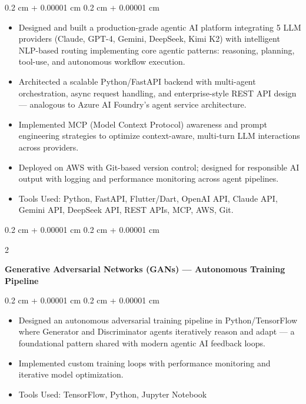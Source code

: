 \documentclass[10pt, letterpaper]{article}
\newenvironment{highlights}{
    \begin{itemize}[
        topsep=0.10 cm,
        parsep=0.10 cm,
        partopsep=0pt,
        itemsep=0pt,
        leftmargin=0.4 cm + 10pt
    ]
}{
    \end{itemize}
}
\newenvironment{onecolentry}{
    \begin{adjustwidth}{
        0.2 cm + 0.00001 cm
    }{
        0.2 cm + 0.00001 cm
    }
}{
    \end{adjustwidth}
}
\newenvironment{twocolentry}[2][]{
    \onecolentry
    \def\secondColumn{#2}
    \setcolumnwidth{\fill, 4.5 cm}
    \begin{paracol}{2}
}{
    \switchcolumn \raggedleft \secondColumn
    \end{paracol}
    \endonecolentry
}
\let\hrefWithoutArrow\href
\renewcommand{\href}[2]{\hrefWithoutArrow{#1}{\ifthenelse{\equal{#2}{}}{ }{#2 }\raisebox{.15ex}{\footnotesize \faExternalLink*}}}
\begin{document}
        \vspace{0.10 cm}
        \begin{onecolentry}
            \begin{highlights}
                \item Designed and built a production-grade agentic AI platform integrating 5 LLM providers (Claude, GPT-4, Gemini, DeepSeek, Kimi K2) with intelligent NLP-based routing implementing core agentic patterns: reasoning, planning, tool-use, and autonomous workflow execution.
                \item Architected a scalable Python/FastAPI backend with multi-agent orchestration, async request handling, and enterprise-style REST API design — analogous to Azure AI Foundry's agent service architecture.
                \item Implemented MCP (Model Context Protocol) awareness and prompt engineering strategies to optimize context-aware, multi-turn LLM interactions across providers.
                \item Deployed on AWS with Git-based version control; designed for responsible AI output with logging and performance monitoring across agent pipelines.
                \item Tools Used: Python, FastAPI, Flutter/Dart, OpenAI API, Claude API, Gemini API, DeepSeek API, REST APIs, MCP, AWS, Git.
            \end{highlights}
        \end{onecolentry}

        \vspace{0.2 cm}

        \begin{twocolentry}{
            \textit{\href{https://GitHub.com/yashpalsince2004/Generative-Adversarial-Networks-GANs-with-TensorFlow.git}{GAN}}}
            \textbf{Generative Adversarial Networks (GANs) — Autonomous Training Pipeline}
        \end{twocolentry}

        \vspace{0.10 cm}
        \begin{onecolentry}
            \begin{highlights}
                \item Designed an autonomous adversarial training pipeline in Python/TensorFlow where Generator and Discriminator agents iteratively reason and adapt — a foundational pattern shared with modern agentic AI feedback loops.
                \item Implemented custom training loops with performance monitoring and iterative model optimization.
                \item Tools Used: TensorFlow, Python, Jupyter Notebook
            \end{highlights}
        \end{onecolentry}
\end{document}

